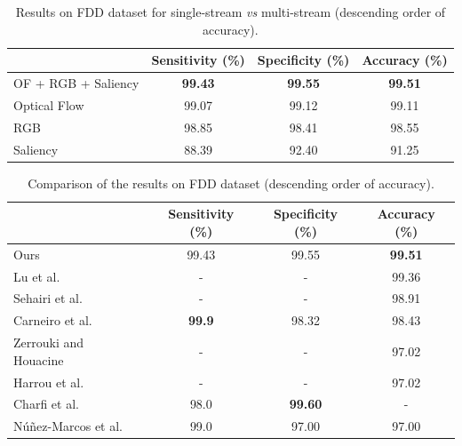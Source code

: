 \documentclass[conference]{IEEEtran}
\begin{document}
\begin{table}[!htb]
\renewcommand{\tabcolsep}{2.5mm}
\renewcommand{\arraystretch}{1.15}
\centering
\caption{Results on FDD dataset for single-stream \textit{vs} multi-stream (descending order of accuracy).}
\label{tab:fdd-ensem}
\begin{tabular}{lccc}
\toprule
 & Sensitivity (\%) & Specificity (\%) & Accuracy (\%) \\
 \midrule
 OF + RGB + Saliency & \textbf{99.43} & \textbf{99.55} & \textbf{99.51} \\
 Optical Flow        & 99.07          & 99.12          & 99.11          \\
 RGB                 & 98.85          & 98.41          & 98.55          \\
 Saliency            & 88.39          & 92.40          & 91.25          \\
 \bottomrule
\end{tabular}
\end{table}

\begin{table}[!htb]
\renewcommand{\tabcolsep}{2.5mm}
\renewcommand{\arraystretch}{1.15}
\centering
\caption{Comparison of the results on FDD dataset (descending order of accuracy).}
\label{tab:fdd-our-their}
\begin{tabular}{lccc}
\toprule
 & Sensitivity (\%)  & Specificity (\%)  & Accuracy (\%) \\
 \midrule
 Ours                                                 & 99.43             & 99.55             & \textbf{99.51} \\
 Lu et al.~\cite{lu2019deep}                          & -                 & -                 & 99.36          \\
 Sehairi et al.~\cite{sehairi2018elderly}             & -                 & -                 & 98.91          \\
 Carneiro et al.~\cite{Carneiro2019}                  & \textbf{99.9}     & 98.32             & 98.43          \\
 Zerrouki and Houacine~\cite{zerrouki2018combined}    & -                 & -                 & 97.02          \\
 Harrou et al.~\cite{harrou2017vision}                & -                 & -                 & 97.02          \\
 Charfi et al.~\cite{charfi2012definition}            & 98.0              & \textbf{99.60}    & -              \\
 N\'u\~nez-Marcos et al.~\cite{nunez2017vision}       & 99.0              & 97.00             & 97.00          \\
\bottomrule
\end{tabular}
\end{table}
 
\end{document}

